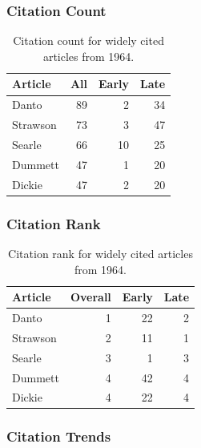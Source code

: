 \documentclass[
  10pt,
  letterpaper,
  DIV=11,
  numbers=noendperiod,
  twoside]{scrartcl}
\begin{document}
\subsubsection*{Citation Count}\label{sec-count-1964}

\begin{longtable}[]{@{}lrrr@{}}

\caption{\label{tbl-citation-count-1964}Citation count for widely cited
articles from 1964.}

\tabularnewline

\toprule\noalign{}
Article & All & Early & Late \\
\midrule\noalign{}
\endhead
\bottomrule\noalign{}
\endlastfoot
Danto & 89 & 2 & 34 \\
Strawson & 73 & 3 & 47 \\
Searle & 66 & 10 & 25 \\
Dummett & 47 & 1 & 20 \\
Dickie & 47 & 2 & 20 \\

\end{longtable}

\subsubsection*{Citation Rank}\label{sec-rank-1964}

\begin{longtable}[]{@{}lrrr@{}}

\caption{\label{tbl-citation-rank-1964}Citation rank for widely cited
articles from 1964.}

\tabularnewline

\toprule\noalign{}
Article & Overall & Early & Late \\
\midrule\noalign{}
\endhead
\bottomrule\noalign{}
\endlastfoot
Danto & 1 & 22 & 2 \\
Strawson & 2 & 11 & 1 \\
Searle & 3 & 1 & 3 \\
Dummett & 4 & 42 & 4 \\
Dickie & 4 & 22 & 4 \\

\end{longtable}

\subsubsection*{Citation Trends}\label{sec-trends-1964}
\end{document}
